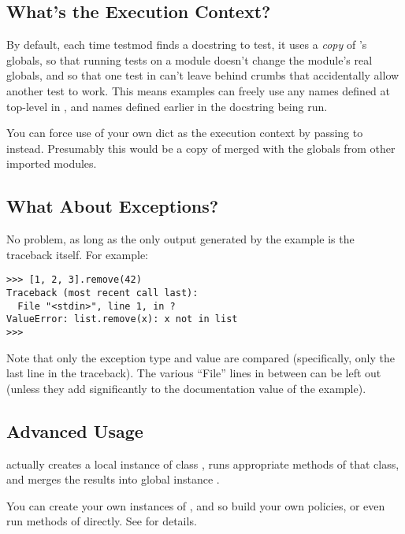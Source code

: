 \subsection{What's the Execution Context?}

By default, each time testmod finds a docstring to test, it uses a
\emph{copy} of 's globals, so that running tests on a module
doesn't change the module's real globals, and so that one test in
 can't leave behind crumbs that accidentally allow another test
to work.  This means examples can freely use any names defined at top-level
in , and names defined earlier in the docstring being run.

You can force use of your own dict as the execution context by passing
 to  instead.  Presumably this
would be a copy of  merged with the globals from other
imported modules.

\subsection{What About Exceptions?}

No problem, as long as the only output generated by the example is the
traceback itself.  For example:

\begin{verbatim}
>>> [1, 2, 3].remove(42)
Traceback (most recent call last):
  File "<stdin>", line 1, in ?
ValueError: list.remove(x): x not in list
>>>
\end{verbatim}

Note that only the exception type and value are compared (specifically,
only the last line in the traceback).  The various ``File'' lines in
between can be left out (unless they add significantly to the documentation
value of the example).

\subsection{Advanced Usage}

 actually creates a local instance of class
, runs appropriate methods of that class, and merges
the results into global  instance .

You can create your own instances of , and so build your
own policies, or even run methods of  directly.  See
 for details.


